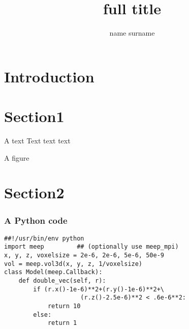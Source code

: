 \documentclass[t]{beamer} \usepackage[czech]{babel} \usepackage[utf8]{inputenc} \usetheme{Singapore}
\title[short title]{full title}
\author{name surname} \institute{} \date{}
\begin{document}
\section{Introduction}

\begin{frame}		%
	\titlepage
\end{frame}		%
\section{Section1}
\begin{frame}{A text}	%
Text text text
\end{frame} 		%

\begin{frame}{A figure}	%
\begin{center} 
\vspace{-.5cm}
\end{center} 
\end{frame} 		%

\section{Section2}
\begin{frame}[fragile] \frametitle{A Python code}%
\begin{scriptsize}
\begin{lstlisting}
##!/usr/bin/env python
import meep 		## (optionally use meep_mpi)
x, y, z, voxelsize = 2e-6, 2e-6, 5e-6, 50e-9
vol = meep.vol3d(x, y, z, 1/voxelsize)
class Model(meep.Callback):
    def double_vec(self, r):
        if (r.x()-1e-6)**2+(r.y()-1e-6)**2+\
                     (r.z()-2.5e-6)**2 < .6e-6**2:
            return 10
        else: 
            return 1
\end{lstlisting}
\end{scriptsize}
\end{frame}
\end{document}
